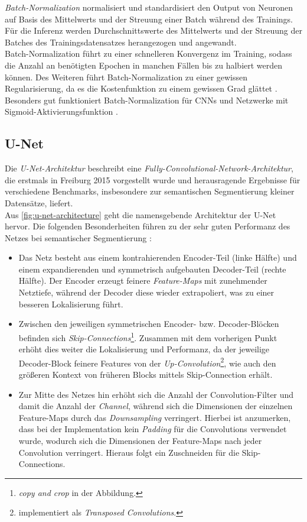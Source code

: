 \textit{Batch-Normalization} normalisiert und standardisiert den Output von Neuronen auf Basis des Mittelwerts 
und der Streuung einer Batch während des Trainings. Für die Inferenz werden Durchschnittswerte 
des Mittelwerts und der Streuung der Batches des Trainingsdatensatzes herangezogen und angewandt. \\
Batch-Normalization führt zu einer schnelleren Konvergenz im Training, 
sodass die Anzahl an benötigten Epochen in manchen Fällen bis zu halbiert werden können. Des Weiteren führt 
Batch-Normalization zu einer gewissen Regularisierung, da es die Kostenfunktion zu einem gewissen Grad glättet 
\cites[S.~317--320]{Goodfellow.2016}{Ioffe.11022015}.
Besonders gut funktioniert Batch-Normalization für \acp{CNN} und Netzwerke mit Sigmoid-Aktivierungsfunktion
\cites[S.~425]{Goodfellow.2016}.

\subsection{U-Net} \label{sec:architekturkomponenten:unet}

Die \textit{U-Net-Architektur} beschreibt eine \textit{Fully-Convolutional-Network-Architektur}, die erstmals in Freiburg 2015 vorgestellt wurde 
und herausragende Ergebnisse für verschiedene Benchmarks, insbesondere zur semantischen Segmentierung kleiner Datensätze, liefert. \\
Aus \autoref{fig:u-net-architecture} geht die namensgebende Architektur der U-Net hervor. Die folgenden Besonderheiten 
führen zu der sehr guten Performanz des Netzes bei semantischer Segmentierung \cite{Ronneberger.18052015}:
\begin{itemize}
	\item Das Netz besteht aus einem kontrahierenden Encoder-Teil (linke Hälfte) und einem expandierenden und symmetrisch aufgebauten
	Decoder-Teil (rechte Hälfte). Der Encoder erzeugt feinere \textit{Feature-Maps} mit zunehmender Netztiefe, 
	während der Decoder diese wieder extrapoliert, was zu einer besseren Lokalisierung führt. 
	\item Zwischen den jeweiligen symmetrischen Encoder- bzw. Decoder-Blöcken befinden sich \textit{Skip-Connections}\footnote{\textit{copy and crop} in der Abbildung.}.
	Zusammen mit dem vorherigen Punkt erhöht dies weiter die Lokalisierung und Performanz, da der jeweilige Decoder-Block feinere Features von der \textit{Up-Convolution}\footnote{implementiert als \textit{Transposed Convolutions}.},
	wie auch den größeren Kontext von früheren Blocks mittels Skip-Connection erhält. 
	\item Zur Mitte des Netzes hin erhöht sich die Anzahl der Convolution-Filter und damit die Anzahl der \textit{Channel}, 
	während sich die Dimensionen der einzelnen Feature-Maps durch das \textit{Downsampling} verringert. 
	Hierbei ist anzumerken, dass bei der Implementation kein \textit{Padding} für die Convolutions verwendet wurde,
	wodurch sich die Dimensionen der Feature-Maps nach jeder Convolution verringert. 
	Hieraus folgt ein Zuschneiden für die Skip-Connections. 
\end{itemize}

